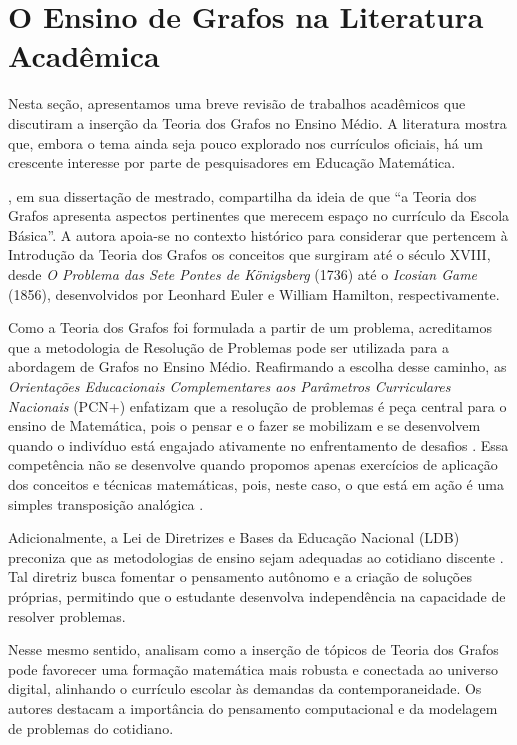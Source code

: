 \documentclass[
  12pt,
  oneside,
  a4paper,
  english,
  brazilian
  ]{abntex2}
\theoremstyle{definition}
\begin{document}
\section{O Ensino de Grafos na Literatura Acadêmica}

Nesta seção, apresentamos uma breve revisão de trabalhos acadêmicos que discutiram a inserção da Teoria dos Grafos no Ensino Médio. A literatura mostra que, embora o tema ainda seja pouco explorado nos currículos oficiais, há um crescente interesse por parte de pesquisadores em Educação Matemática.

\textcite{malta2008}, em sua dissertação de mestrado, compartilha da ideia de que ``a Teoria dos Grafos apresenta aspectos pertinentes que merecem espaço no currículo da Escola Básica''. A autora apoia-se no contexto histórico para considerar que pertencem à Introdução da Teoria dos Grafos os conceitos que surgiram até o século XVIII, desde \textit{O Problema das Sete Pontes de Königsberg} (1736) até o \textit{Icosian Game} (1856), desenvolvidos por Leonhard Euler e William Hamilton, respectivamente.

Como a Teoria dos Grafos foi formulada a partir de um problema, acreditamos que a metodologia de Resolução de Problemas pode ser utilizada para a abordagem de Grafos no Ensino Médio. Reafirmando a escolha desse caminho, as \textit{Orientações Educacionais Complementares aos Parâmetros Curriculares Nacionais} (PCN+) enfatizam que a resolução de problemas é peça central para o ensino de Matemática, pois o pensar e o fazer se mobilizam e se desenvolvem quando o indivíduo está engajado ativamente no enfrentamento de desafios \cite{brasil2002}. Essa competência não se desenvolve quando propomos apenas exercícios de aplicação dos conceitos e técnicas matemáticas, pois, neste caso, o que está em ação é uma simples transposição analógica \cite{brasil2002}.

Adicionalmente, a Lei de Diretrizes e Bases da Educação Nacional (LDB) preconiza que as metodologias de ensino sejam adequadas ao cotidiano discente \cite{brasil1996}. Tal diretriz busca fomentar o pensamento autônomo e a criação de soluções próprias, permitindo que o estudante desenvolva independência na capacidade de resolver problemas.

Nesse mesmo sentido, \textcite{rodrigues2021} analisam como a inserção de tópicos de Teoria dos Grafos pode favorecer uma formação matemática mais robusta e conectada ao universo digital, alinhando o currículo escolar às demandas da contemporaneidade. Os autores destacam a importância do pensamento computacional e da modelagem de problemas do cotidiano.
\end{document}
